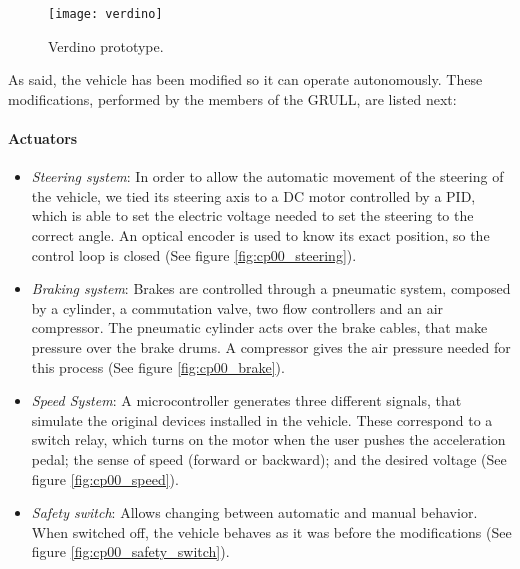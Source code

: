 \begin{figure}[h!]
  \centering
  \texttt{[image: verdino]}
  \caption{Verdino prototype.}\label{fig:cp00_verdino}
\end{figure}


As said, the vehicle has been modified so it can operate autonomously. These modifications, performed by the members of the GRULL, are listed next:

\paragraph{Actuators}\label{ch:chapter00_03_00_00_01}
\begin{itemize}
 \item \emph{Steering system}: In order to allow the automatic movement of the steering of the vehicle, we tied its steering axis to a DC motor controlled by a \ac{PID}, which is able to set the electric voltage needed to set the steering to the correct angle. An optical encoder is used to know its exact position, so the control loop is closed (See figure \ref{fig:cp00_steering}).
 \item \emph{Braking system}: Brakes are controlled through a pneumatic system, composed by a cylinder, a commutation valve, two flow controllers and an air compressor. The pneumatic cylinder acts over the brake cables, that make pressure over the brake drums. A compressor gives the air pressure needed for this process (See figure \ref{fig:cp00_brake}).
 \item \emph{Speed System}: A microcontroller generates three different signals, that simulate the original devices installed in the vehicle. These correspond to a switch relay, which turns on the motor when the user pushes the acceleration pedal; the sense of speed (forward or backward); and the desired voltage (See figure \ref{fig:cp00_speed}).
 \item \emph{Safety switch}: Allows changing between automatic and manual behavior. When switched off, the vehicle behaves as it was before the modifications (See figure \ref{fig:cp00_safety_switch}).
\end{itemize}

